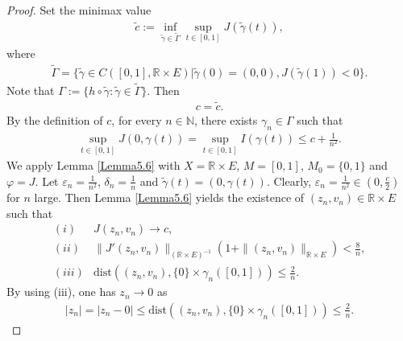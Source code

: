 \documentclass[12pt,a4paper,reqno]{amsart}
\numberwithin{equation}{section}
\begin{document}
\begin{proof}
Set the minimax value
\begin{equation*}
\begin{aligned}
\tilde{c}:=\inf\limits_{\tilde{\gamma}\in \tilde{\Gamma}}\sup\limits_{t\in [0,1]}J(\tilde{\gamma}(t)),
\end{aligned}
\end{equation*}
where
\begin{equation*}
\begin{aligned}
\tilde{\Gamma}=\{\tilde{\gamma}\in C\left([0, 1], \mathbb{R}\times E\right)| \tilde{\gamma}(0)=(0,0), J(\tilde{\gamma}(1))<0\}.
\end{aligned}
\end{equation*}
Note that $\Gamma:=\{h\circ \tilde{\gamma}:\tilde{\gamma}\in \tilde{\Gamma}\}$. Then
\begin{equation*}
\begin{aligned}
c=\tilde{c}.
\end{aligned}
\end{equation*}
By the definition of $c$, for every $n\in \mathbb{N}$, there exists $\gamma_{n}\in \Gamma$ such that
\begin{equation*}
\begin{aligned}
\sup\limits_{t\in [0,1]}J(0,\gamma(t))
=
\sup\limits_{t\in [0,1]}I(\gamma(t))
\leqslant c+\frac{1}{n^{2}}.
\end{aligned}
\end{equation*}
We apply Lemma \ref{Lemma5.6} with $X=\mathbb{R}\times E$, $M=[0,1]$, $M_{0}=\{0,1\}$ and $\varphi=J$.
Let $\varepsilon_{n}=\frac{1}{n^{2}}$, $\delta_{n}=\frac{1}{n}$ and $\tilde{\gamma}(t)=(0,\gamma(t))$.
Clearly, $\varepsilon_{n}=\frac{1}{n^{2}}\in(0,\frac{c}{2})$ for $n$ large.
Then Lemma \ref{Lemma5.6} yields the existence of $(z_{n},v_{n})\in \mathbb{R}\times E$ such that
\begin{equation*}
\begin{aligned}
(i)&J(z_{n},v_{n})\to c,\\
(ii)&\|J'(z_{n},v_{n})\|_{(\mathbb{R}\times E)^{-1}}(1+\|(z_{n},v_{n})\|_{\mathbb{R}\times E})< \frac{8}{n},\\
(iii)&\mathrm{dist}((z_{n},v_{n}),\{0\}\times \gamma_{n}([0,1]))\leqslant \frac{2}{n}.
\end{aligned}
\end{equation*}
By using (iii), one has  $z_{n}\to0$ as
\begin{equation*}
\begin{aligned}
|z_{n}|=|z_{n}-0|\leqslant \mathrm{dist}((z_{n},v_{n}),\{0\}\times \gamma_{n}([0,1]))\leqslant \frac{2}{n}.

\end{aligned}
\end{equation*}
\end{proof}
\end{document}

